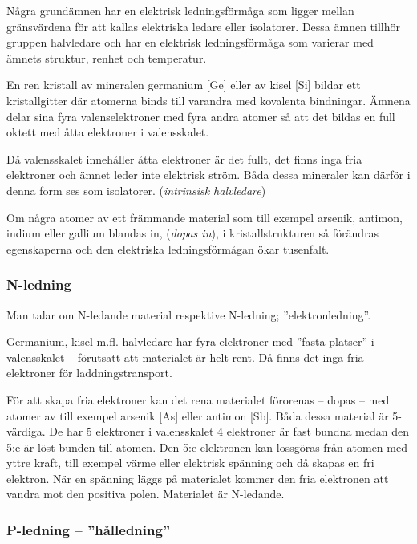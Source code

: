 Några grundämnen har en elektrisk ledningsförmåga som ligger mellan gränsvärdena
för att kallas elektriska ledare eller isolatorer.
Dessa ämnen tillhör gruppen halvledare och har en elektrisk ledningsförmåga som
varierar med ämnets struktur, renhet och temperatur.

En ren kristall av mineralen germanium [Ge] eller av kisel [Si] bildar ett
kristallgitter där atomerna binds till varandra med kovalenta bindningar.
Ämnena delar sina fyra valenselektroner med fyra andra atomer så att det
bildas en full oktett med åtta elektroner i valensskalet.

Då valensskalet innehåller åtta elektroner är det fullt, det finns inga fria
elektroner och ämnet leder inte elektrisk ström.
Båda dessa mineraler kan därför i denna form ses som isolatorer.
(\emph{intrinsisk halvledare})

Om några atomer av ett främmande material som till exempel arsenik, antimon,
indium eller gallium blandas in, (\emph{dopas in}), i kristallstrukturen så
förändras egenskaperna och den elektriska ledningsförmågan ökar tusenfalt.

\subsubsection{N-ledning}

Man talar om N-ledande material respektive N-led\-ni\-ng; ''elektronled\-ni\-ng''.

Germanium, kisel m.fl. halvledare har fyra elektroner med ''fasta platser'' i
valensskalet -- förutsatt att materialet är helt rent.
Då finns det inga fria elektroner för laddningstransport.

För att skapa fria elektroner kan det rena materialet förorenas -- dopas -- med
atomer av till exempel arsenik [As] eller antimon [Sb].
Båda dessa material är 5-värdiga.
De har 5 elektroner i valensskalet 4 elektroner är fast bundna medan
den 5:e är löst bunden till atomen.
Den 5:e elektronen kan lossgöras från atomen med yttre kraft, till exempel värme eller
elektrisk spänning och då skapas en fri elektron.
När en spänning läggs på materialet kommer den fria elektronen att vandra mot
den positiva polen.
Materialet är N-ledande.

\subsubsection{P-ledning -- ''hålledning''}


